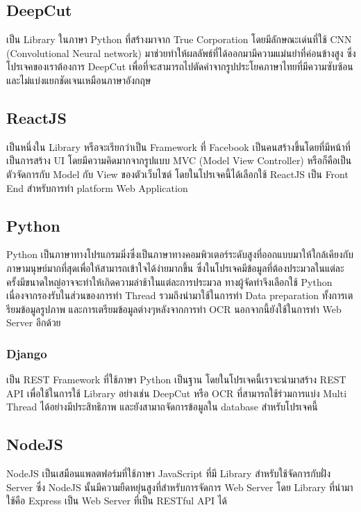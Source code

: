 \subsection{DeepCut}

เป็น Library ในภาษา Python ที่สร้างมาจาก True Corporation โดยมีลักษณะเด่นที่ใช้ CNN (Convolutional Neural network) \cite{keiron} มาช่วยทำให้ผลลัพธ์ที่ได้ออกมามีความแม่นยำที่ค่อนข้างสูง  ซึ่งโปรเจคของเราต้องการ DeepCut เพื่อที่จะสามารถไปตัดคำจากรูปประโยคภาษาไทยที่มีความซับซ้อน และไม่แบ่งแยกชัดเจนเหมือนภาษาอังกฤษ 

\subsection{ReactJS}

เป็นหนึ่งใน Library หรือจะเรียกว่าเป็น Framework ที่ Facebook  เป็นคนสร้างขึ้นโดยที่มีหน้าที่เป็นการสร้าง UI โดยมีความคิดมากจากรูปแบบ MVC \cite{techterms} (Model View Controller) หรือก็คือเป็นตัวจัดการกับ Model กับ View ของตัวเว็บไซต์ โดยในโปรเจคนี้ได้เลือกใช้ ReactJS เป็น Front End สำหรับการทำ platform Web Application 

\subsection{Python}

Python เป็นภาษาทางโปรแกรมมิ่งซึ่งเป็นภาษาทางคอมพิวเตอร์ระดับสูงที่ออกแบบมาให้ใกล้เคียงกับภาษามนุษย์มากที่สุดเพื่อให้สามารถเข้าใจได้ง่ายมากขึ้น ซึ่งในโปรเจคมีข้อมูลที่ต้องประมวลในแต่ละครั้งมีขนาดใหญ่อาจจะทำให้เกิดความล่าช้าในแต่ละการประมวล ทางผู้จัดทำจึงเลือกใช้ Python เนื่องจากรองรับในส่วนของการทำ Thread รวมถึงนำมาใช้ในการทำ Data preparation ทั้งการเตรียมข้อมูลรูปภาพ และการเตรียมข้อมูลต่างๆหลังจากการทำ OCR นอกจากนี้ยังใช้ในการทำ Web Server อีกด้วย 

\subsubsection{Django}

เป็น REST Framework ที่ใช้ภาษา Python เป็นฐาน โดยในโปรเจคนี้เราจะนำมาสร้าง REST API  เพื่อใช้ในการใช้ Library อย่างเช่น DeepCut หรือ OCR ที่สามารถใช้ร่วมการแบ่ง Multi Thread ได้อย่างมีประสิทธิภาพ และยังสามาถจัดการข้อมูลใน database สำหรับโปรเจคนี้

\subsection{NodeJS}

NodeJS เป็นเสมือนแพลตฟอร์มที่ใช้ภาษา JavaScript ที่มี Library สำหรับใช้จัดการกับฝั่ง Server ซึ่ง NodeJS นั้นมีความยืดหยุ่นสูงที่สำหรับการจัดการ Web Server โดย Library ที่นำมาใช้คือ Express เป็น Web Server ที่เป็น RESTful API ได้